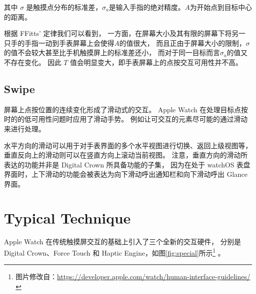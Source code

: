其中 $\sigma$ 是触摸点分布的标准差，$\sigma_a$是输入手指的绝对精度。$A$为开始点到目标中心的距离。

根据 FFitts' 定律我们可以看到，
一方面，在屏幕大小及其有限的屏幕下将另一只手的手指一动到手表屏幕上会使得$A$的值很大，
而且正由于屏幕大小的限制，$\sigma$的值不会较大甚至比手机触摸屏上的标准差还小，
而对于同一目标而言$\sigma_a$的值又不存在变化。
因此 $T$ 值会明显变大，即手表屏幕上的点按交互可用性并不高。

\subsection{Swipe}

屏幕上点按位置的连续变化形成了滑动式的交互。
Apple Watch 在处理目标点按时的的低可用性问题时应用了滑动手势。
例如让可交互的元素尽可能的通过滑动来进行处理。

水平方向的滑动可以用于对手表界面的多个水平视图进行切换、返回上级视图等，
垂直反向上的滑动则可以在竖直方向上滚动当前视图。
注意，垂直方向的滑动所表达的功能并非是 Digital Crown 所具备功能的子集，
因为在处于 watchOS 表盘界面时，上下滑动的功能会被表达为向下滑动呼出通知栏和向下滑动呼出 Glance 界面。

\section{Typical Technique}

Apple Watch 在传统触摸屏交互的基础上引入了三个全新的交互硬件，
分别是Digital Crown、Force Touch 和 Haptic Engine，如图\ref{fig:special}所示\footnote{图片修改自：\url{https://developer.apple.com/watch/human-interface-guidelines/}}
。


